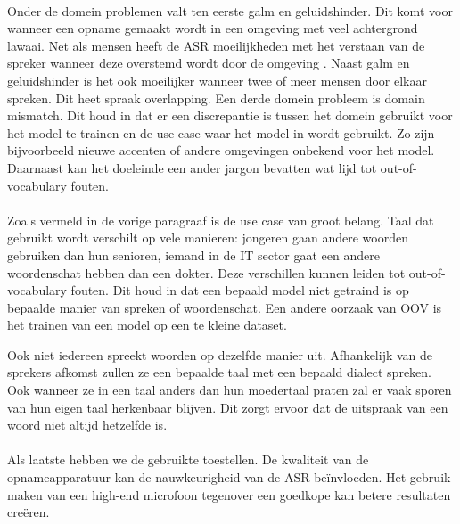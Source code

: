 \paragraph{}%
Onder de domein problemen valt ten eerste galm en geluidshinder. Dit komt voor wanneer een opname gemaakt wordt in een omgeving met veel achtergrond lawaai. Net als mensen heeft de ASR moeilijkheden met het verstaan van de spreker wanneer deze overstemd wordt door de omgeving \autocite{Alharbi2021}. Naast galm en geluidshinder is het ook moeilijker wanneer twee of meer mensen door elkaar spreken. Dit heet spraak overlapping. Een derde domein probleem is domain mismatch. Dit houd in dat er een discrepantie is tussen het domein gebruikt voor het model te trainen en de use case waar het model in wordt gebruikt. Zo zijn bijvoorbeeld nieuwe accenten of andere omgevingen onbekend voor het model. Daarnaast kan het doeleinde een ander jargon bevatten wat lijd tot out-of-vocabulary fouten.

\paragraph{}%
Zoals vermeld in de vorige paragraaf is de use case van groot belang. Taal dat gebruikt wordt verschilt op vele manieren: jongeren gaan andere woorden gebruiken dan hun senioren, iemand in de IT sector gaat een andere woordenschat hebben dan een dokter. Deze verschillen kunnen leiden tot out-of-vocabulary fouten. Dit houd in dat een bepaald model niet getraind is op bepaalde manier van spreken of woordenschat. Een andere oorzaak van OOV is het trainen van een model op een te kleine dataset.

Ook niet iedereen spreekt woorden op dezelfde manier uit. Afhankelijk van de sprekers afkomst zullen ze een bepaalde taal met een bepaald dialect spreken. Ook wanneer ze in een taal anders dan hun moedertaal praten zal er vaak sporen van hun eigen taal herkenbaar blijven. Dit zorgt ervoor dat de uitspraak van een woord niet altijd hetzelfde is.

\paragraph{}%
Als laatste hebben we de gebruikte toestellen. De kwaliteit van de opnameapparatuur kan de nauwkeurigheid van de ASR beïnvloeden. Het gebruik maken van een high-end microfoon tegenover een goedkope kan betere resultaten creëren.


